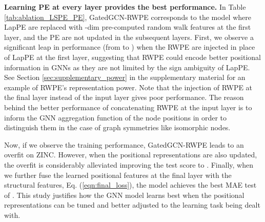 \documentclass{article} \usepackage{iclr2021_conference,times}
\begin{document}
{\bf Learning PE at every layer provides the best performance.} In Table \ref{tab:ablation_LSPE_PE}, GatedGCN-RWPE corresponds to the model where LapPE are replaced with -dim pre-computed random walk features at the first layer, and the PE are not updated in the subsequent layers. First, we observe a significant leap in performance (from  to ) when the RWPE are injected in place of LapPE at the first layer, suggesting that RWPE could encode better positional information in GNNs as they are not limited by the sign ambiguity of LapPE. See Section \ref{sec:supplementary_power} in the supplementary material for an example of RWPE's representation power. Note that the injection of RWPE at the final layer instead of the input layer gives poor performance. The reason behind the better performance of concatenating RWPE at the input layer is to inform the GNN aggregation function of the node positions in order to distinguish them in the case of graph symmetries like isomorphic nodes.

Now, if we observe the training performance, GatedGCN-RWPE leads to an overfit on ZINC. However, when the positional representations are also updated, the overfit is considerably alleviated improving the test score to . Finally, when we further fuse the learned positional features at the final layer with the structural features, Eq. (\ref{eqn:final_loss}), the model achieves the best  MAE test of . This study justifies how the GNN model learns best when the positional representations can be tuned and better adjusted to the learning task being dealt with. 
\end{document}
